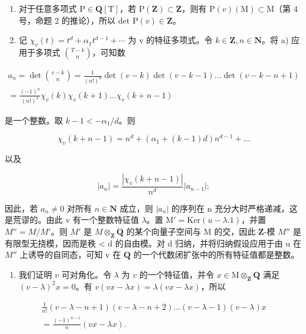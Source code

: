 \begin{enumerate}
\def\labelenumi{\alph{enumi})}
\item
  对于任意多项式 \(\mathrm{P} \in \mathbf{Q}[\mathrm{T}]\)，若 \(\mathrm{P}(\mathbf{Z}) \subset \mathbf{Z}\)，则有 \(\mathrm{P}(v)(\mathrm{M}) \subset \mathrm{M}\)（第 4 号，命题 2 的推论），所以 det \(\mathrm{P}(v) \in \mathbf{Z}\)。
\item
  记 \(\chi_{v}(t)=t^{d}+\alpha_{1}t^{d-1}+\cdots\) 为 v 的特征多项式。令 \(k\in\mathbf{Z}, n\in\mathbf{N}\)。将 a) 应用于多项式 \(\binom{T-k}{n}\)，可知数
\end{enumerate}

\[
\begin{array}{l} a _ {n} = \det \binom {v - k} {n} = \frac {1}{(n !) ^ {d}} \det (v - k) \det (v - k - 1) \dots \det (v - k - n + 1) \\ = \frac {(- 1) ^ {n}}{(n !) ^ {4}} \chi_ {v} (k) \chi_ {v} (k + 1) \dots \chi_ {v} (k + n - 1) \end{array}
\]

是一个整数。取 \(k - 1 < -\alpha_{1} / d\)。则

\[
\chi_ {v} (k + n - 1) = n ^ {d} + (\alpha_ {1} + (k - 1) d) n ^ {d - 1} + \dots
\]

以及

\[
| a _ {n} | = \frac {| \chi_ {v} (k + n - 1) |}{n ^ {d}} | a _ {n - 1} |;
\]

因此，若 \(a_{n} \neq 0\) 对所有 \(n \in \mathbf{N}\) 成立，则 \(|a_{n}|\) 的序列在 n 充分大时严格递减，这是荒谬的。由此 v 有一个整数特征值 \(\lambda\)。置 \(\mathrm{M}' = \mathrm{Ker}(u - \lambda.1)\)，并置 \(M'' = M/M'\)。则 \(M'\) 是 \(M \otimes_{\mathbf{Z}} \mathbf{Q}\) 的某个向量子空间与 M 的交，因此 \(\mathbf{Z}\)-模 \(M''\) 是有限型无挠模，因而是秩 \textless{} d 的自由模。对 d 归纳，并将归纳假设应用于由 u 在 \(M''\) 上诱导的自同态，可知 v 在 \(\mathbf{Q}\) 的一个代数闭扩张中的所有特征值都是整数。

\begin{enumerate}
\def\labelenumi{\alph{enumi})}
\setcounter{enumi}{2}
\tightlist
\item
  我们证明 \(v\) 可对角化。令 \(\lambda\) 为 \(v\) 的一个特征值，并令 \(x \in \mathrm{M} \otimes_{\mathbf{Z}} \mathbf{Q}\) 满足 \((v - \lambda)^2 x = 0\)。有 \(v(vx - \lambda x) = \lambda(vx - \lambda x)\)，所以
\end{enumerate}

\[
\begin{array}{c} \frac {1}{n !} (v - \lambda - n + 1) (v - \lambda - n + 2) \ldots (v - \lambda - 1) (v - \lambda) x \\ = \frac {(- 1) ^ {n - 1}}{n} (v x - \lambda x). \end{array}
\]

